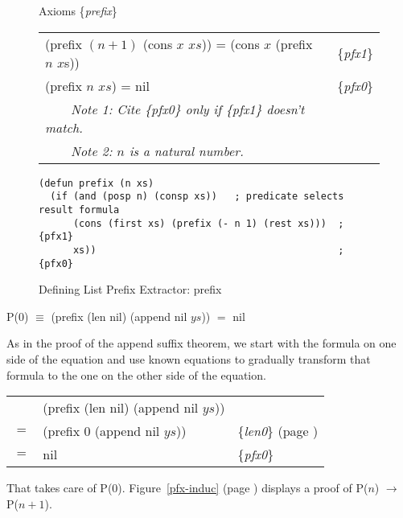 \begin{figure}
\begin{center}
Axioms \{\emph{prefix}\}                                           \\
\begin{tabular}{ll}
(prefix $(n + 1)$ (cons $x$ $xs$)) = (cons $x$ (prefix $n$ $x$s)) & \{\emph{pfx1}\} \\
(prefix $n$ $xs$) =  nil                                          & \{\emph{pfx0}\} \\
~~~~\emph{Note 1: Cite \{\emph{pfx0}\} only if \{\emph{pfx1}\} doesn't match.}&\\
~~~~\emph{Note 2: $n$ is a natural number.}
\end{tabular}
\begin{Verbatim}
(defun prefix (n xs)
  (if (and (posp n) (consp xs))   ; predicate selects result formula
      (cons (first xs) (prefix (- n 1) (rest xs)))  ; {pfx1}
      xs))                                          ; {pfx0}
\end{Verbatim}
\end{center}
\caption{Defining List Prefix Extractor: prefix}
\label{prefix-equations}
\end{figure}

\begin{center}
P($0$) $\equiv$ (prefix (len nil) (append nil $ys$)) $=$ nil
\end{center}

As in the proof of the append suffix theorem, we start with the formula on one side of the equation and use known equations to gradually transform that formula to the one on the other side of the equation.

\begin{center}
\begin{tabular}{lll}
    & (prefix (len nil) (append nil $ys$))  &                                                      \\
$=$ & (prefix 0 (append nil $ys$))          & \{\emph{len0}\} (page \pageref{len-equations})   \\
$=$ & nil                                   & \{\emph{pfx0}\}                                      \\
\end{tabular}
\end{center}

That takes care of P(0). Figure~\ref{pfx-induc} (page \pageref{pfx-induc}) displays a proof of P($n$) $\rightarrow$ P($n+1$).

